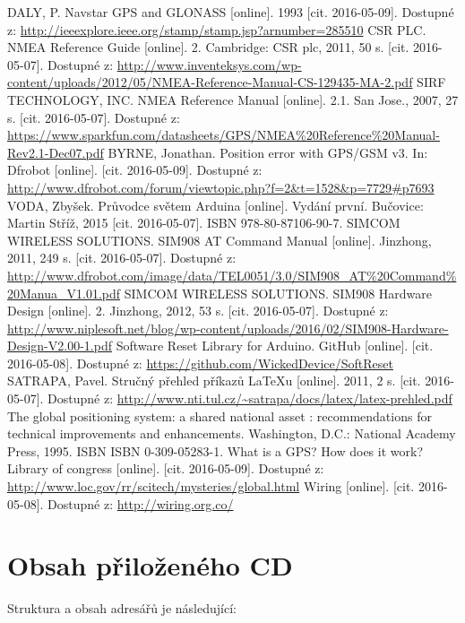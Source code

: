 \documentclass[FM,MP]{tulthesis}  %
\begin{document}
\begin{thebibliography}{10}
DALY, P. Navstar GPS and GLONASS [online]. 1993 [cit. 2016-05-09]. Dostupné z: \url{http://ieeexplore.ieee.org/stamp/stamp.jsp?arnumber=285510}
CSR PLC. NMEA Reference Guide [online]. 2. Cambridge: CSR plc, 2011, 50 s. [cit. 2016-05-07]. Dostupné z: \url{http://www.inventeksys.com/wp-content/uploads/2012/05/NMEA-Reference-Manual-CS-129435-MA-2.pdf}
SIRF TECHNOLOGY, INC. NMEA Reference Manual [online]. 2.1. San Jose., 2007, 27 s. [cit. 2016-05-07]. Dostupné z: \url{https://www.sparkfun.com/datasheets/GPS/NMEA\%20Reference\%20Manual-Rev2.1-Dec07.pdf}
BYRNE, Jonathan. Position error with GPS/GSM v3. In: Dfrobot [online]. [cit. 2016-05-09]. Dostupné z: \url{http://www.dfrobot.com/forum/viewtopic.php?f=2\&t=1528\&p=7729\#p7693}
VODA, Zbyšek. Průvodce světem Arduina [online]. Vydání první. Bučovice: Martin Stříž, 2015 [cit. 2016-05-07]. ISBN 978-80-87106-90-7.
SIMCOM WIRELESS SOLUTIONS. SIM908 AT Command Manual [online]. Jinzhong, 2011, 249 s. [cit. 2016-05-07]. Dostupné z: \url{http://www.dfrobot.com/image/data/TEL0051/3.0/SIM908\_AT\%20Command\%20Manua\_V1.01.pdf}
SIMCOM WIRELESS SOLUTIONS. SIM908 Hardware Design [online]. 2. Jinzhong, 2012, 53 s. [cit. 2016-05-07]. Dostupné z: \url{http://www.niplesoft.net/blog/wp-content/uploads/2016/02/SIM908-Hardware-Design-V2.00-1.pdf}
Software Reset Library for Arduino. GitHub [online]. [cit. 2016-05-08]. Dostupné z: \url{https://github.com/WickedDevice/SoftReset}
SATRAPA, Pavel. Stručný přehled příkazů LaTeXu [online]. 2011, 2 s. [cit. 2016-05-07]. Dostupné z: \url{http://www.nti.tul.cz/~satrapa/docs/latex/latex-prehled.pdf}
The global positioning system: a shared national asset : recommendations for technical improvements and enhancements. Washington, D.C.: National Academy Press, 1995. ISBN ISBN 0-309-05283-1.
What is a GPS? How does it work? Library of congress [online]. [cit. 2016-05-09]. Dostupné z: \url{http://www.loc.gov/rr/scitech/mysteries/global.html}
Wiring [online]. [cit. 2016-05-08]. Dostupné z: \url{http://wiring.org.co/}
\end{thebibliography}


\appendix
\chapter{Obsah přiloženého CD}
Struktura a obsah adresářů je následující:
\end{document}
